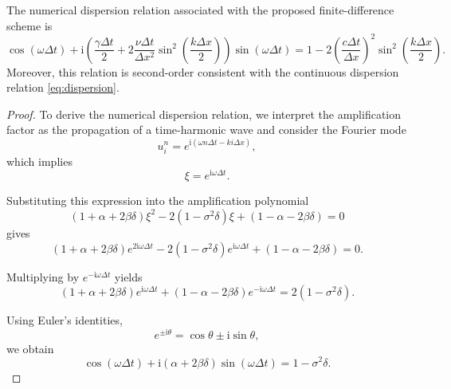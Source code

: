 \documentclass{Configuration_Files/PoliMi3i_thesis}
\begin{document}
\begin{proposition}
The numerical dispersion relation associated with the proposed finite-difference
scheme is
\begin{equation*}
\cos(\omega\Delta t)
+
\mathrm{i}
\left(
\frac{\gamma\Delta t}{2}
+
2\frac{\nu\Delta t}{\Delta x^2}
\sin^2\!\left(\frac{k\Delta x}{2}\right)
\right)
\sin(\omega\Delta t)
=
1
-
2
\left(
\frac{c\Delta t}{\Delta x}
\right)^2
\sin^2\!\left(\frac{k\Delta x}{2}\right).
\end{equation*}
Moreover, this relation is second-order consistent with the continuous
dispersion relation \eqref{eq:dispersion}.
\end{proposition}

\begin{proof}
To derive the numerical dispersion relation, we interpret the amplification
factor as the propagation of a time-harmonic wave and consider the Fourier mode
\begin{equation*}
u_i^n=e^{\mathrm{i}(\omega n \Delta t - k i \Delta x)},
\end{equation*}
which implies
\begin{equation*}
\xi=e^{\mathrm{i}\omega\Delta t}.
\end{equation*}

Substituting this expression into the amplification polynomial
\begin{equation*}
(1+\alpha+2\beta\delta)\xi^2
-2(1-\sigma^2\delta)\xi
+(1-\alpha-2\beta\delta)=0
\end{equation*}
gives
\begin{equation*}
(1+\alpha+2\beta\delta)e^{2\mathrm{i}\omega\Delta t}
-2(1-\sigma^2\delta)e^{\mathrm{i}\omega\Delta t}
+(1-\alpha-2\beta\delta)=0.
\end{equation*}

Multiplying by $e^{-\mathrm{i}\omega\Delta t}$ yields
\begin{equation*}
(1+\alpha+2\beta\delta)e^{\mathrm{i}\omega\Delta t}
+
(1-\alpha-2\beta\delta)e^{-\mathrm{i}\omega\Delta t}
=
2(1-\sigma^2\delta).
\end{equation*}

Using Euler's identities,
\begin{equation*}
e^{\pm\mathrm{i}\theta}
=
\cos\theta
\pm
\mathrm{i}\sin\theta,
\end{equation*}
we obtain
\begin{equation*}
\cos(\omega\Delta t)
+
\mathrm{i}(\alpha+2\beta\delta)
\sin(\omega\Delta t)
=
1-\sigma^2\delta.
\end{equation*}


\end{proof}
\end{document}
